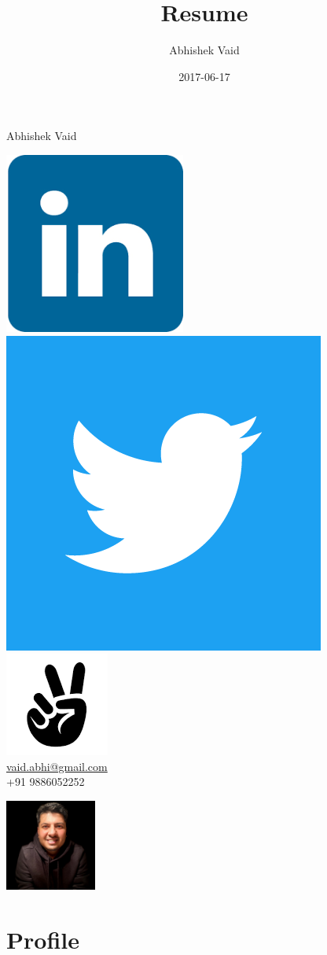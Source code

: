 \documentclass{article}
\title{Resume}
\date{2017-06-17}
\author{Abhishek Vaid}
\begin{document}
\begin{huge} 
	\noindent Abhishek Vaid \hspace{1ex}
\end{huge} \href{http://linkedin.com/in/vaidabhishek86}{\includegraphics[height=4ex]{linkedin}}
\hspace{4ex} \href{https://twitter.com/vaidabhishek}{\includegraphics[height=4ex]{twitter}}
\hspace{3ex} \href{https://angel.co/abhishek-vaid}{\includegraphics[height=4ex]{angellist}}\\
\noindent \href{mailto: vaid.abhi@gmail.com}{vaid.abhi@gmail.com} \\+91 9886052252\\   
\vspace{-95pt}
\begin{flushright}
\includegraphics[width=3.0cm]{vaid}
\end{flushright}
 \vspace{-15pt}
\section{Profile}
\end{document}
